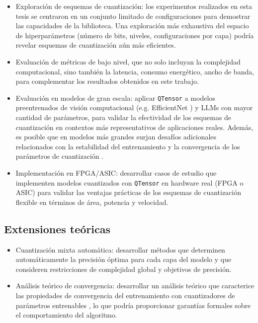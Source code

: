 \begin{itemize}
    \item Exploración de esquemas de cuantización: los experimentos realizados en esta tesis se centraron en un conjunto limitado de configuraciones para demostrar las capacidades de la biblioteca. Una exploración más exhaustiva del espacio de hiperparámetros (número de bits, niveles, configuraciones por capa) podría revelar esquemas de cuantización aún más eficientes.

    \item Evaluación de métricas de bajo nivel, que no solo incluyan la complejidad computacional, sino también la latencia, consumo energético, ancho de banda, para complementar los resultados obtenidos en este trabajo.

    \item Evaluación en modelos de gran escala: aplicar \texttt{QTensor} a modelos preentrenados de visión computacional (e.g. EfficientNet \cite{tan2020efficientnetrethinkingmodelscaling}) y LLMs con mayor cantidad de parámetros, para validar la efectividad de los esquemas de cuantización en contextos más representativos de aplicaciones reales. Además, es posible que en modelos más grandes surjan desafíos adicionales relacionados con la estabilidad del entrenamiento y la convergencia de los parámetros de cuantización \cite{wang2024artsciencequantizinglargescale}.

    \item Implementación en FPGA/ASIC: desarrollar casos de estudio que implementen modelos cuantizados con \texttt{QTensor} en hardware real (FPGA o ASIC) para validar las ventajas prácticas de los esquemas de cuantización flexible en términos de área, potencia y velocidad.
\end{itemize}

\subsection{Extensiones teóricas}

\begin{itemize}
    \item Cuantización mixta automática: desarrollar métodos que determinen automáticamente la precisión óptima para cada capa del modelo y que consideren restricciones de complejidad global y objetivos de precisión.

    \item Análisis teórico de convergencia: desarrollar un análisis teórico que caracterice las propiedades de convergencia del entrenamiento con cuantizadores de parámetros entrenables \cite{jeong2025discretenessfinitesampleanalysisstraightthrough}, lo que podría proporcionar garantías formales sobre el comportamiento del algoritmo.
\end{itemize}

